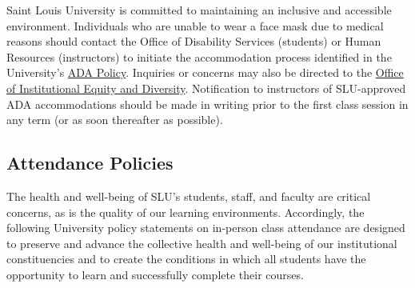 \documentclass[
]{book}
\begin{document}
Saint Louis University is committed to maintaining an inclusive and accessible environment. Individuals who are unable to wear a face mask due to medical reasons should contact the Office of Disability Services (students) or Human Resources (instructors) to initiate the accommodation process identified in the University's \href{https://www.slu.edu/human-resources/pdfs/policies/americans-disabilities-act-policy.pdf}{ADA Policy}. Inquiries or concerns may also be directed to the \href{https://www.slu.edu/general-counsel/institutional-equity-diversity/index.php}{Office of Institutional Equity and Diversity}. Notification to instructors of SLU-approved ADA accommodations should be made in writing prior to the first class session in any term (or as soon thereafter as possible).

\hypertarget{attendance-policies}{%
\subsection{Attendance Policies}\label{attendance-policies}}

The health and well-being of SLU's students, staff, and faculty are critical concerns, as is the quality of our learning environments. Accordingly, the following University policy statements on in-person class attendance are designed to preserve and advance the collective health and well-being of our institutional constituencies and to create the conditions in which all students have the opportunity to learn and successfully complete their courses.
\end{document}

